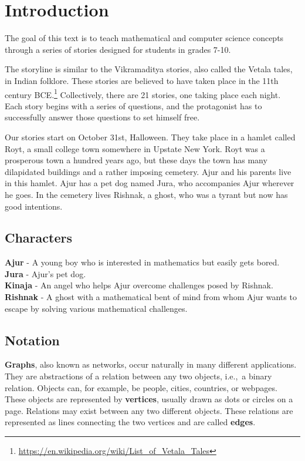 \chapter{Introduction}
The goal of this text is to teach mathematical and computer science concepts through a series of stories
designed for students in grades 7-10.

The storyline is similar to the Vikramaditya stories, also called the Vetala tales, in Indian folklore. These stories are believed to have taken place in the 11th century BCE.\footnote{\url{https://en.wikipedia.org/wiki/List_of_Vetala_Tales}}
Collectively, there are 21 stories, one taking place each night. Each story begins with a series of questions, and the protagonist has to successfully answer those questions to set himself free. 


Our stories start on October 31st, Halloween. They take place in a hamlet called Royt, a small college town somewhere in Upstate New York. Royt was a prosperous town a hundred years ago, but these days the town has many dilapidated buildings and a rather imposing cemetery. Ajur and his parents live in this hamlet. Ajur has a pet dog named Jura, who accompanies Ajur wherever he goes.  In the cemetery lives Rishnak, a ghost, who was a tyrant but now has good intentions.

\section{Characters}

\textbf {Ajur} - A young boy who is interested in mathematics but easily gets bored.\\
\noindent
\textbf {Jura} - Ajur's pet dog.\\
\noindent
\textbf{Kinaja} - An angel who helps Ajur overcome challenges posed by Rishnak.\\
\noindent
\textbf{Rishnak} - A ghost with a mathematical bent of mind from whom Ajur wants to escape by solving various mathematical challenges.\\

\section{Notation}
\textbf{Graphs}, also known as networks, occur naturally in many different applications. They are abstractions of a relation between any two objects, i.e.,~a binary relation. Objects can, for example, be people, cities, countries, or webpages. These objects are represented by \textbf{vertices}, usually drawn as dots 
or circles on a page. Relations may exist between any two different objects. These relations are represented as lines connecting the two vertices and are called \textbf{edges}.

